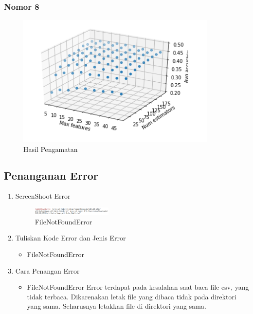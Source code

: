 \subsubsection{Nomor 8}
\hfill\break

\begin{figure}[H]
\centerline{\includegraphics[width=10cm]{figures/1174084/3/11.png}}
\caption{Hasil Pengamatan }
\label{labelgambar}
\end{figure}

\subsection{Penanganan Error}
\begin{enumerate}
	\item ScreenShoot Error
	\begin{figure}[H]
		\includegraphics[width=4cm]{figures/1174084/3/error1.png}
		\centering
		\caption{FileNotFoundError}
	\end{figure}
	\item Tuliskan Kode Error dan Jenis Error
	\begin{itemize}
		\item FileNotFoundError
	\end{itemize}
	\item Cara Penangan Error
	\begin{itemize}
		\item FileNotFoundError
		\hfill\break
		Error terdapat pada kesalahan saat baca file csv, yang tidak terbaca. Dikarenakan letak file yang dibaca tidak pada direktori yang sama. Seharusnya letakkan file di direktori yang sama. 
	\end{itemize}
\end{enumerate}


